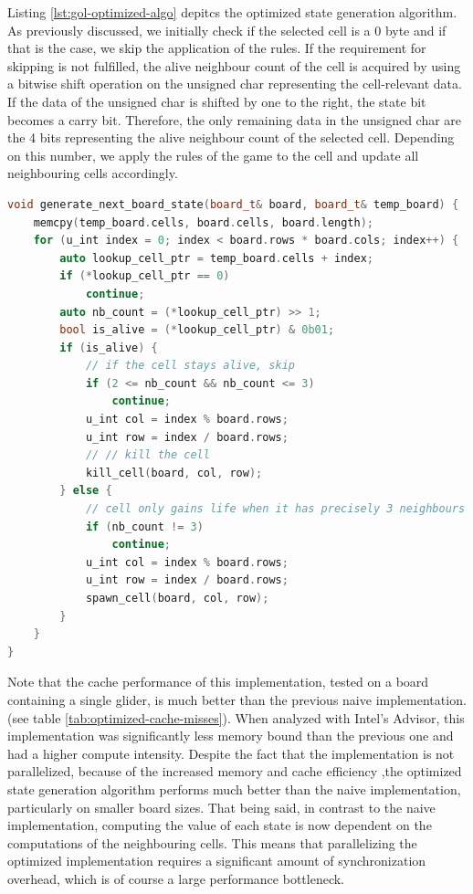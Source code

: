 \documentclass[a4paper,english,12pt,twoside=false]{scrartcl} %
\begin{document}
Listing \ref{lst:gol-optimized-algo} depitcs the optimized state generation algorithm. As previously discussed, we initially check if the selected cell is a 0 byte and if that is the case, we skip the application of the rules. If the requirement for skipping is not fulfilled, the alive neighbour count of the cell is acquired by using a bitwise shift operation on the unsigned char representing the cell-relevant data. If the data of the unsigned char is shifted by one to the right, the state bit becomes a carry bit. Therefore, the only remaining data in the unsigned char are the 4 bits representing the alive neighbour count of the selected cell. Depending on this number, we apply the rules of the game to the cell and update all neighbouring cells accordingly.

\pagebreak

\begin{lstlisting}[caption={Parallel Naive State Generation Algorithm},label={lst:gol-optimized-algo},language=C++]
void generate_next_board_state(board_t& board, board_t& temp_board) {
    memcpy(temp_board.cells, board.cells, board.length);
    for (u_int index = 0; index < board.rows * board.cols; index++) {
        auto lookup_cell_ptr = temp_board.cells + index;
        if (*lookup_cell_ptr == 0)
            continue;
        auto nb_count = (*lookup_cell_ptr) >> 1;
        bool is_alive = (*lookup_cell_ptr) & 0b01;
        if (is_alive) {
            // if the cell stays alive, skip
            if (2 <= nb_count && nb_count <= 3)
                continue;
            u_int col = index % board.rows;
            u_int row = index / board.rows;
            // // kill the cell
            kill_cell(board, col, row);
        } else {
            // cell only gains life when it has precisely 3 neighbours
            if (nb_count != 3)
                continue;
            u_int col = index % board.rows;
            u_int row = index / board.rows;
            spawn_cell(board, col, row);
        }
    }
}
\end{lstlisting}

Note that the cache performance of this implementation, tested on a board containing a single glider, is much better than the previous naive implementation. (see table \ref{tab:optimized-cache-misses}). When analyzed with Intel's Advisor, this implementation was significantly less memory bound than the previous one and had a higher compute intensity. Despite the fact that the implementation is not parallelized, because of the increased memory and cache efficiency ,the optimized state generation algorithm performs much better than the naive implementation, particularly on smaller board sizes. That being said, in contrast to the naive implementation, computing the value of each state is now dependent on the computations of the neighbouring cells. This means that parallelizing the optimized implementation requires a significant amount of synchronization overhead, which is of course a large performance bottleneck. 
\end{document}
